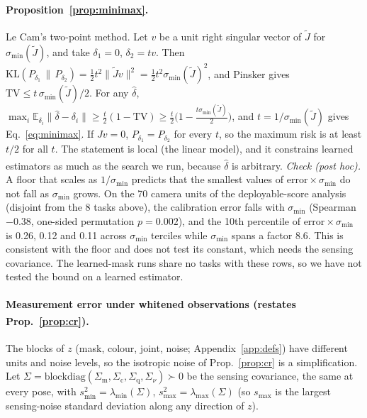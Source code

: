 \documentclass{article}
\newcommand{\ph}{\textsuperscript{\dag}}
\begin{document}
\paragraph{Proposition~\ref{prop:minimax}.} Le Cam's two-point method. Let $v$ be a unit right singular vector of $\tilde
J$ for $\sigma_{\min}(\tilde J)$, and take $\delta_1 = 0$, $\delta_2 = t v$. Then $\mathrm{KL}(P_{\delta_1}\,\|\,
P_{\delta_2}) = \tfrac12 t^2 \|\tilde J v\|^2 = \tfrac12 t^2 \sigma_{\min}(\tilde J)^2$, and Pinsker gives $\mathrm{TV}
\le t\,\sigma_{\min}(\tilde J)/2$. For any $\hat\delta$, $\max_i \mathbb{E}_{\delta_i}\|\hat\delta - \delta_i\| \ge
\tfrac{t}{2}(1 - \mathrm{TV}) \ge \tfrac{t}{2}\big(1 - \tfrac{t\sigma_{\min}(\tilde J)}{2}\big)$, and $t =
1/\sigma_{\min}(\tilde J)$ gives Eq.~\ref{eq:minimax}. If $Jv = 0$, $P_{\delta_1} = P_{\delta_2}$ for every $t$, so the
maximum risk is at least $t/2$ for all $t$. The statement is local (the linear model), and it constrains learned
estimators as much as the search we run, because $\hat\delta$ is arbitrary.
\emph{Check (post hoc\ph).} A floor that scales as $1/\sigma_{\min}$ predicts that the smallest values of
$\text{error}\times\sigma_{\min}$ do not fall as $\sigma_{\min}$ grows. On the 70 camera units of the deployable-score
analysis (disjoint from the 8 tasks above), the calibration error falls with
$\sigma_{\min}$ (Spearman $-0.38$, one-sided permutation $p = 0.002$), and the 10th percentile of $\text{error}\times
\sigma_{\min}$ is 0.26, 0.12 and 0.11 across $\sigma_{\min}$ terciles while $\sigma_{\min}$ spans a factor 8.6. This is
consistent with the floor and does not test its constant, which needs the sensing covariance. The learned-mask runs
share no tasks with these rows, so we have not tested the bound on a learned estimator.

\paragraph{Measurement error under whitened observations (restates Prop.~\ref{prop:cr})\ph.}
The blocks of $z$ (mask, colour, joint, noise; Appendix~\ref{app:defs}) have different units and noise levels, so the
isotropic noise of Prop.~\ref{prop:cr} is a simplification. Let $\Sigma = \mathrm{blockdiag}(\Sigma_{\mathrm m},
\Sigma_{\mathrm c}, \Sigma_{\mathrm q}, \Sigma_\nu) \succ 0$ be the sensing covariance, the same at every pose, with
$s_{\min}^2 = \lambda_{\min}(\Sigma)$, $s_{\max}^2 = \lambda_{\max}(\Sigma)$ (so $s_{\max}$ is the largest sensing-noise
standard deviation along any direction of $z$).
\end{document}
